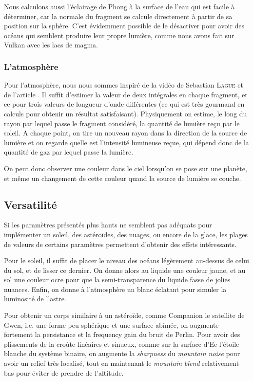 \documentclass[a4paper,12pt,twoside]{article}
\begin{document}
Nous calculons aussi l'éclairage de Phong à la surface de l'eau qui est facile à déterminer, car la normale du fragment se calcule directement à partir de sa position sur la sphère. C'est évidemment possible de le désactiver pour avoir des océans qui semblent produire leur propre lumière, comme nous avons fait sur Vulkan avec les lacs de magma.

\subsubsection{L'atmosphère}

Pour l'atmosphère, nous nous sommes inspiré de la vidéo de Sebastian \textsc{Lague} \cite{codingatmosphere} et de l'article \cite{atmscattering}. Il suffit d'estimer la valeur de deux intégrales en chaque fragment, et ce pour trois valeurs de longueur d'onde différentes (ce qui est très gourmand en calculs pour obtenir un résultat satisfaisant). Physiquement on estime, le long du rayon par lequel passe le fragment considéré, la quantité de lumière reçu par le soleil. A chaque point, on tire un nouveau rayon dans la direction de la source de lumière et on regarde quelle est l'intensité lumineuse reçue, qui dépend donc de la quantité de gaz par lequel passe la lumière. 

On peut donc observer une couleur dans le ciel lorsqu'on se pose sur une planète, et même un changement de cette couleur quand la source de lumière se couche.


\subsection{Versatilité}

Si les paramètres présentés plus hauts ne semblent pas adéquats pour implémenter un soleil, des astéroïdes, des nuages, ou encore de la glace, les plages de valeurs de certains paramètres permettent d'obtenir des effets intéressants.

Pour le soleil, il suffit de placer le niveau des océans légèrement au-dessus de celui du sol, et de lisser ce dernier. On donne alors au liquide une couleur jaune, et au sol une couleur ocre pour que la semi-transparence du liquide fasse de jolies nuances. Enfin, on donne à l'atmosphère un blanc éclatant pour simuler la luminosité de l'astre.

Pour obtenir un corps similaire à un astéroïde, comme Companion le satellite de Gwen, i.e. une forme peu sphérique et une surface abîmée, on augmente fortement la persistance et la frequency gain du bruit de Perlin.
Pour avoir des plissements de la croûte linéaires et sinueux, comme sur la surface d’Ee l'étoile blanche du système binaire, on augmente la \textit{sharpness} du \textit{mountain noise} pour avoir un relief très localisé, tout en maintenant le \textit{mountain blend} relativement bas pour éviter de prendre de l'altitude.
\end{document}
